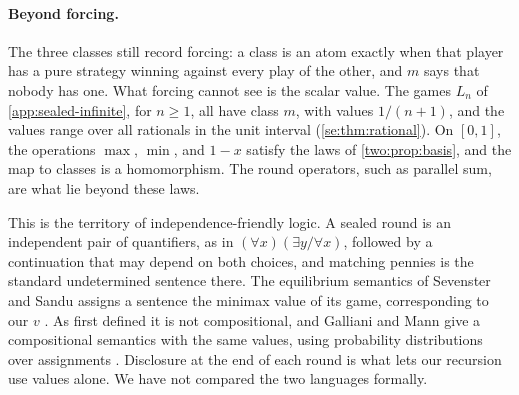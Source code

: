 \paragraph{Beyond forcing.}
The three classes still record forcing: a class is an atom exactly when that player has a pure strategy winning against every play of the other, and $m$ says that nobody has one. What forcing cannot see is the scalar value. The games $L_n$ of \cref{app:sealed-infinite}, for $n\geq1$, all have class $m$, with values $1/(n+1)$, and the values range over all rationals in the unit interval (\cref{se:thm:rational}). On $[0,1]$, the operations $\max$, $\min$, and $1-x$ satisfy the laws of \cref{two:prop:basis}, and the map to classes is a homomorphism. The round operators, such as parallel sum, are what lie beyond these laws.

This is the territory of independence-friendly logic. A sealed round is an independent pair of quantifiers, as in $(\forall x)(\exists y/\forall x)$, followed by a continuation that may depend on both choices, and matching pennies is the standard undetermined sentence there. The equilibrium semantics of Sevenster and Sandu assigns a sentence the minimax value of its game, corresponding to our $v$ \cite{SevensterSandu2010,MannSanduSevenster2011,Sevenster2014}. As first defined it is not compositional, and Galliani and Mann give a compositional semantics with the same values, using probability distributions over assignments \cite{GallianiMann2013}. Disclosure at the end of each round is what lets our recursion use values alone. We have not compared the two languages formally.
